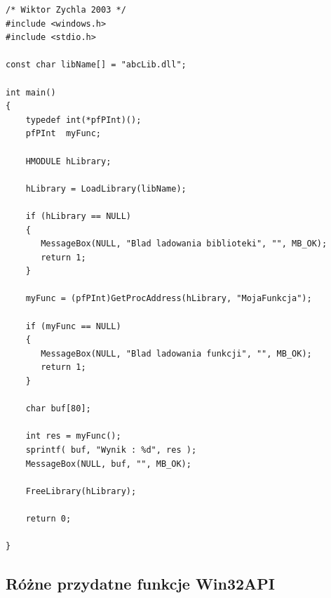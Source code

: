 \begin{scriptsize}
\begin{verbatim}
/* Wiktor Zychla 2003 */
#include <windows.h>
#include <stdio.h>

const char libName[] = "abcLib.dll";

int main()
{
    typedef int(*pfPInt)();
    pfPInt  myFunc;

    HMODULE hLibrary;
    
    hLibrary = LoadLibrary(libName);

    if (hLibrary == NULL) 
    {
       MessageBox(NULL, "Blad ladowania biblioteki", "", MB_OK);
       return 1;
    }
    
    myFunc = (pfPInt)GetProcAddress(hLibrary, "MojaFunkcja");
    
    if (myFunc == NULL)
    {
       MessageBox(NULL, "Blad ladowania funkcji", "", MB_OK);
       return 1;
    }
    
    char buf[80];

    int res = myFunc();
	sprintf( buf, "Wynik : %d", res );
    MessageBox(NULL, buf, "", MB_OK);
    
    FreeLibrary(hLibrary);

    return 0;
      
}
\end{verbatim}
\end{scriptsize}

\subsection{Różne przydatne funkcje Win32API}

